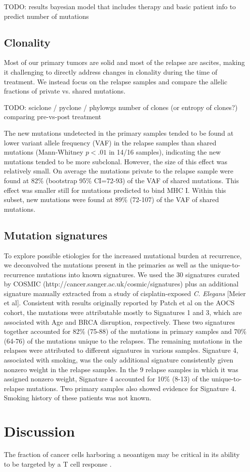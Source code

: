 TODO: results bayesian model that includes therapy and basic patient info to predict number of mutations


\subsection*{Clonality}
Most of our primary tumors are solid and most of the relapse are ascites, making it challenging to directly address changes in clonality during the time of treatment. We instead focus on the relapse samples and compare the allelic fractions of private vs. shared mutations.

TODO: sciclone / pyclone / phylowgs number of clones (or entropy of clones?) comparing pre-vs-post treatment

The new mutations undetected in the primary samples tended to be found at lower variant allele frequency (VAF) in the relapse samples than shared mutations (Mann-Whitney $p \lt .01$ in 14/16 samples), indicating the new mutations tended to be more subclonal. However, the size of this effect was relatively small. On average the mutations private to the relapse sample were found at 82\% (bootstrap 95\% CI=72-93) of the VAF of shared mutations. This effect was smaller still for mutations predicted to bind MHC I. Within this subset, new mutations were found at 89\% (72-107) of the VAF of shared mutations.

\subsection*{Mutation signatures}
To explore possible etiologies for the increased mutational burden at recurrence, we deconvolved the mutations present in the primaries as well as the unique-to-recurrence mutations into known signatures. We used the 30 signatures curated by COSMIC (http://cancer.sanger.ac.uk/cosmic/signatures) plus an additional signature manually extracted from a study of cisplatin-exposed \textit{C. Elegans} [Meier et al]. Consistent with results originally reported by Patch et al on the AOCS cohort, the mutations were attributable mostly to Signatures 1 and 3, which are associated with Age and BRCA disruption, respectively. These two signatures together accounted for 82\% (75-88) of the mutations in primary samples and 70\% (64-76) of the mutations unique to the relapses. The remaining mutations in the relapses were attributed to different signatures in various samples. Signature 4, associated with smoking, was the only additional signature consistently given nonzero weight in the relapse samples. In the 9 relapse samples in which it was assigned nonzero weight, Signature 4 accounted for 10\% (8-13) of the unique-to-relapse mutations. Two primary samples also showed evidence for Signature 4. Smoking history of these patients was not known.


\section*{Discussion}

The fraction of cancer cells harboring a neoantigen may be critical in its ability to be targeted by a T cell response \cite{McGranahan_2016}.

\fi
